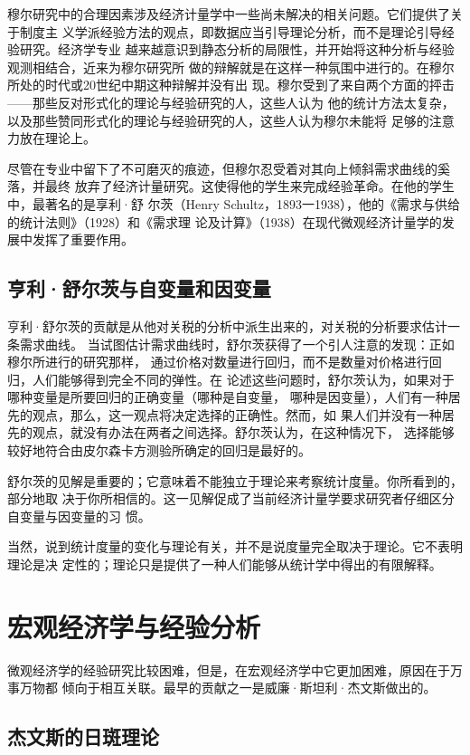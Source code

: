 穆尔研究中的合理因素涉及经济计量学中一些尚未解决的相关问题。它们提供了关于制度主
义学派经验方法的观点，即数据应当引导理论分析，而不是理论引导经验研究。经济学专业
越来越意识到静态分析的局限性，并开始将这种分析与经验观测相结合，近来为穆尔研究所
做的辩解就是在这样一种氛围中进行的。在穆尔所处的时代或20世纪中期这种辩解并没有出
现。穆尔受到了来自两个方面的抨击——那些反对形式化的理论与经验研究的人，这些人认为
他的统计方法太复杂，以及那些赞同形式化的理论与经验研究的人，这些人认为穆尔未能将
足够的注意力放在理论上。

尽管在专业中留下了不可磨灭的痕迹，但穆尔忍受着对其向上倾斜需求曲线的奚落，并最终
放弃了经济计量研究。这使得他的学生来完成经验革命。在他的学生中，最著名的是享利·舒
尔茨（Henry Schultz，1893一1938），他的《需求与供给的统计法则》（1928）和《需求理
论及计算》（1938）在现代微观经济计量学的发展中发挥了重要作用。

\subsection{亨利·舒尔茨与自变量和因变量}

亨利·舒尔茨的贡献是从他对关税的分析中派生出来的，对关税的分析要求估计一条需求曲线。
当试图估计需求曲线时，舒尔茨获得了一个引人注意的发现：正如穆尔所进行的研究那样，
通过价格对数量进行回归，而不是数量对价格进行回归，人们能够得到完全不同的弹性。在
论述这些问题时，舒尔茨认为，如果对于哪种变量是所要回归的正确变量（哪种是自变量，
哪种是因变量），人们有一种居先的观点，那么，这一观点将决定选择的正确性。然而，如
果人们并没有一种居先的观点，就没有办法在两者之间选择。舒尔茨认为，在这种情况下，
选择能够较好地符合由皮尔森卡方测验所确定的回归是最好的。

舒尔茨的见解是重要的；它意味着不能独立于理论来考察统计度量。你所看到的，部分地取
决于你所相信的。这一见解促成了当前经济计量学要求研究者仔细区分自变量与因变量的习
惯。

当然，说到统计度量的变化与理论有关，并不是说度量完全取决于理论。它不表明理论是决
定性的；理论只是提供了一种人们能够从统计学中得出的有限解释。

\section{宏观经济学与经验分析}

微观经济学的经验研究比较困难，但是，在宏观经济学中它更加困难，原因在于万事万物都
倾向于相互关联。最早的贡献之一是威廉·斯坦利·杰文斯做出的。

\subsection{杰文斯的日斑理论}

